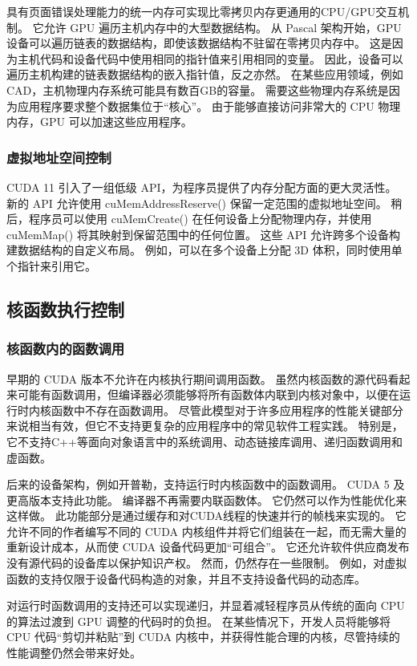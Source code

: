 具有页面错误处理能力的统一内存可实现比零拷贝内存更通用的CPU/GPU交互机制。 它允许 GPU 遍历主机内存中的大型数据结构。 
从 Pascal 架构开始，GPU 设备可以遍历链表的数据结构，即使该数据结构不驻留在零拷贝内存中。 
这是因为主机代码和设备代码中使用相同的指针值来引用相同的变量。 
因此，设备可以遍历主机构建的链表数据结构的嵌入指针值，反之亦然。 
在某些应用领域，例如CAD，主机物理内存系统可能具有数百GB的容量。 
需要这些物理内存系统是因为应用程序要求整个数据集位于“核心”。 
由于能够直接访问非常大的 CPU 物理内存，GPU 可以加速这些应用程序。

\subsubsection{虚拟地址空间控制}
CUDA 11 引入了一组低级 API，为程序员提供了内存分配方面的更大灵活性。 
新的 API 允许使用 cuMemAddressReserve() 保留一定范围的虚拟地址空间。 
稍后，程序员可以使用 cuMemCreate() 在任何设备上分配物理内存，并使用 cuMemMap() 将其映射到保留范围中的任何位置。 
这些 API 允许跨多个设备构建数据结构的自定义布局。 例如，可以在多个设备上分配 3D 体积，同时使用单个指针来引用它。

\subsection{核函数执行控制}
\subsubsection{核函数内的函数调用}
早期的 CUDA 版本不允许在内核执行期间调用函数。 
虽然内核函数的源代码看起来可能有函数调用，但编译器必须能够将所有函数体内联到内核对象中，以便在运行时内核函数中不存在函数调用。 
尽管此模型对于许多应用程序的性能关键部分来说相当有效，但它不支持更复杂的应用程序中的常见软件工程实践。 
特别是，它不支持C++等面向对象语言中的系统调用、动态链接库调用、递归函数调用和虚函数。

后来的设备架构，例如开普勒，支持运行时内核函数中的函数调用。 CUDA 5 及更高版本支持此功能。 编译器不再需要内联函数体。 
它仍然可以作为性能优化来这样做。 此功能部分是通过缓存和对CUDA线程的快速并行的帧栈来实现的。 
它允许不同的作者编写不同的 CUDA 内核组件并将它们组装在一起，而无需大量的重新设计成本，从而使 CUDA 设备代码更加“可组合”。 
它还允许软件供应商发布没有源代码的设备库以保护知识产权。 然而，仍然存在一些限制。 
例如，对虚拟函数的支持仅限于设备代码构造的对象，并且不支持设备代码的动态库。

对运行时函数调用的支持还可以实现递归，并显着减轻程序员从传统的面向 CPU 的算法过渡到 GPU 调整的代码时的负担。 
在某些情况下，开发人员将能够将 CPU 代码“剪切并粘贴”到 CUDA 内核中，并获得性能合理的内核，尽管持续的性能调整仍然会带来好处。

